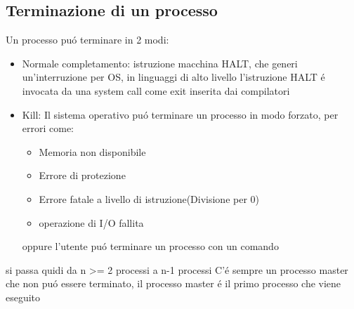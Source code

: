 \subsection{Terminazione di un processo}
Un processo puó terminare in 2 modi:
\begin{itemize}
    \item Normale completamento: istruzione macchina HALT, che generi un'interruzione per OS, in linguaggi di alto livello l'istruzione HALT é invocata da una system call come exit inserita dai compilatori
    \item Kill: Il sistema operativo puó terminare un processo in modo forzato, per errori come:
    \begin{itemize}
        \item Memoria non disponibile
        \item Errore di protezione
        \item Errore fatale a livello di istruzione(Divisione per 0)
        \item operazione di I/O fallita
        \end{itemize}
    oppure l'utente puó terminare un processo con un comando
    \end{itemize}
    si passa quidi da n >= 2 processi a n-1 processi
    C'é sempre un processo master che non puó essere terminato, il processo master é il primo processo che viene eseguito
